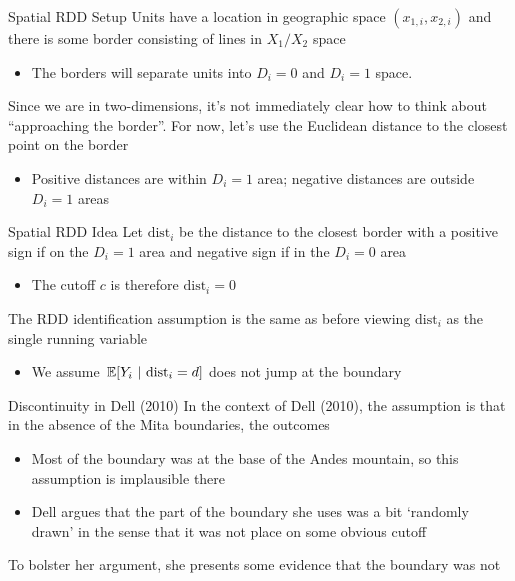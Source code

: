 \documentclass[aspectratio=169,t,11pt,table]{beamer}
\begin{document}
\begin{frame}{Spatial RDD Setup}
  Units have a location in geographic space $(x_{1,i}, x_{2,i})$ and there is some border consisting of lines in $X_1/X_2$ space

  \begin{itemize}
    \item The borders will separate units into $D_i = 0$ and $D_i = 1$ space.
  \end{itemize}

  \pause
  \bigskip
  Since we are in two-dimensions, it's not immediately clear how to think about ``approaching the border''. For now, let's use the Euclidean distance to the closest point on the border
  \begin{itemize}
    \item Positive distances are within $D_i = 1$ area; negative distances are outside $D_i = 1$ areas
  \end{itemize}
\end{frame}

\begin{frame}{Spatial RDD Idea}
  Let $\text{dist}_i$ be the distance to the closest border with a positive sign if on the $D_i = 1$ area and negative sign if in the $D_i = 0$ area
  \begin{itemize}
    \item The cutoff $c$ is therefore $\text{dist}_i = 0$
  \end{itemize}

  \bigskip
  The RDD identification assumption is the same as before viewing $\text{dist}_i$ as the single running variable
  \begin{itemize}
    \item We assume $\expec{Y_i}{\text{dist}_i = d}$ does not jump at the boundary
  \end{itemize}
\end{frame}

\begin{frame}{Discontinuity in Dell (2010)}
  In the context of Dell (2010), the assumption is that in the absence of the Mita boundaries, the outcomes
  \begin{itemize}
    \item Most of the boundary was at the base of the Andes mountain, so this assumption is implausible there
    \item Dell argues that the part of the boundary she uses was a bit `randomly drawn' in the sense that it was not place on some obvious cutoff
  \end{itemize}

  \bigskip
  To bolster her argument, she presents some evidence that the boundary was not 
\end{frame}
\end{document}
